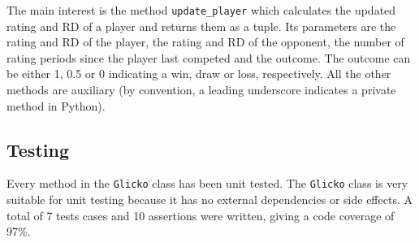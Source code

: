 The main interest is the method \texttt{update\_player} which calculates the updated rating and RD of a player and returns them as a tuple.
Its parameters are the rating and RD of the player, the rating and RD of the opponent, the number of rating periods since the player last competed and the outcome.
The outcome can be either 1, 0.5 or 0 indicating a win, draw or loss, respectively.
All the other methods are auxiliary (by convention, a leading underscore indicates a private method in Python).

\subsection{Testing}
Every method in the \texttt{Glicko} class has been unit tested.
The \texttt{Glicko} class is very suitable for unit testing because it has no external dependencies or side effects.
A total of 7 tests cases and 10 assertions were written, giving a code coverage of 97\%.
